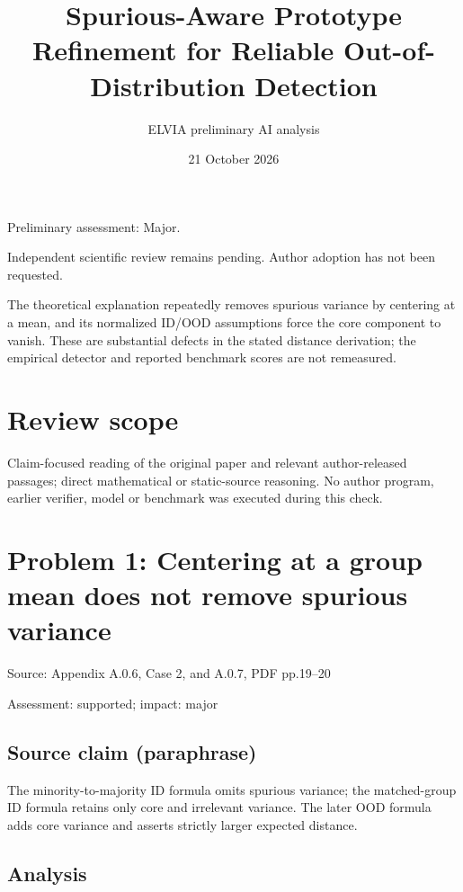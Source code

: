 \documentclass[11pt]{article}
\begin{document}
\title{Spurious-Aware Prototype Refinement for Reliable Out-of-Distribution Detection}

\author{ELVIA preliminary AI analysis}\date{21 October 2026}\maketitle

Preliminary assessment: Major.\par

Independent scientific review remains pending. Author adoption has not been requested.

The theoretical explanation repeatedly removes spurious variance by centering at a mean, and its normalized ID/OOD assumptions force the core component to vanish. These are substantial defects in the stated distance derivation; the empirical detector and reported benchmark scores are not remeasured.

\section*{Review scope}

Claim-focused reading of the original paper and relevant author-released passages; direct mathematical or static-source reasoning. No author program, earlier verifier, model or benchmark was executed during this check.

\section*{Problem 1: Centering at a group mean does not remove spurious variance}

Source: Appendix A.0.6, Case 2, and A.0.7, PDF pp.19–20

Assessment: supported; impact: major

\subsection*{Source claim (paraphrase)}

The minority-to-majority ID formula omits spurious variance; the matched-group ID formula retains only core and irrelevant variance. The later OOD formula adds core variance and asserts strictly larger expected distance.

\subsection*{Analysis}
\end{document}
